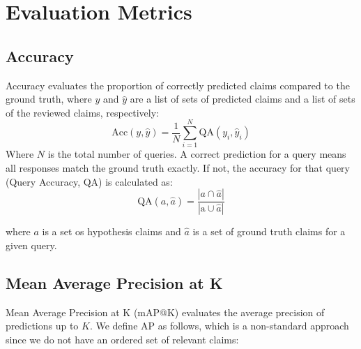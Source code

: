 \documentclass{article}
\begin{document}
\section{Evaluation Metrics}


\subsection{Accuracy}
Accuracy evaluates the proportion of correctly predicted claims compared to the ground truth, where $y$ and $\hat{y}$ are a list of sets of predicted claims and a list of sets of the reviewed claims, respectively:
\begin{equation}
\text{Acc}(y,\hat{y}) = \frac{1}{N}\sum_{i=1}^{N} \text{QA}(y_i, \hat{y}_i)
\end{equation}
Where \( N \) is the total number of queries. A correct prediction for a query means all responses match the ground truth exactly. If not, the accuracy for that query (Query Accuracy, QA) is calculated as:
\begin{equation}
\text{QA}(a, \hat{a}) = \frac{|a \cap \hat{a}|}{|\text{a} \cup \hat{a}|}
\end{equation}

where $a$ is a set os hypothesis claims and $\hat{a}$ is a set of ground truth claims for a given query.

\subsection{Mean Average Precision at K }
Mean Average Precision at K (mAP@K) evaluates the average precision of predictions up to \( K \).
We define AP as follows, which is a non-standard approach since we do not have an ordered set of relevant claims:
\end{document}
